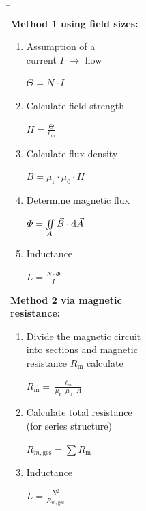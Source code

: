 \begin{frame}
{}
\b{
		\begin{minipage}{0.49\textwidth}
			\vspace*{20pt}
			\textbf{Method 1 using field sizes:}
			\begin{enumerate}%
				\item Assumption of a \\ current $I$ $\rightarrow$ flow \par $\Theta = N\cdot I$
				\item Calculate field strength \par $H=\frac{\Theta}{\ell_{\mathrm{m}}}$
				\item Calculate flux density \par $B=\mu_{\mathrm{r}}\cdot\mu_0\cdot H$
				\item Determine magnetic flux \par $\varPhi = \iint\limits_A \vec{B}\cdot \mathrm{d} \vec{A}$
				\item Inductance \par $L=\frac{N\cdot \varPhi}{I}$\\
			\end{enumerate}
		\end{minipage}
	 \pause
		\begin{minipage}{0.49 \textwidth}
			\vspace*{-30pt}
			\textbf{Method 2 via magnetic \\ resistance:}
			\begin{enumerate}%
				\item Divide the magnetic circuit \\ into sections and magnetic \\ resistance $R_{\mathrm{m}}$ calculate \par $R_{\mathrm{m}}=\frac{\ell_{\mathrm{m}}}{\mu_{\mathrm{r}}\cdot\mu_0\cdot A}$
				\item Calculate total resistance \\ (for series structure) \par $R_{m,\mathrm{ges}} = \sum R_{\mathrm{m}}$
				\item Inductance \par $L=\frac{N^2}{R_{m,\mathrm{ges}}}$
			\end{enumerate}
		\end{minipage}
}
\end{frame}

